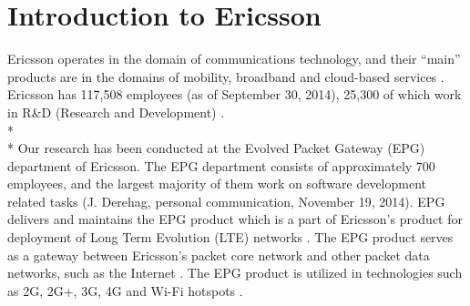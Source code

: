 \documentclass[final_report_innit.tex]{subfiles}
\begin{document}
\section{Introduction to Ericsson}
Ericsson operates in the domain of communications technology, and their “main” products are in the domains of mobility, broadband and cloud-based services \cite{etc} \cite{ecf}. Ericsson has 117,508 employees (as of September 30, 2014), 25,300 of which work in R\&D (Research and Development) \cite{etc}.
\\* 
\\* 
Our research has been conducted at the Evolved Packet Gateway (EPG) department of Ericsson. The EPG department consists of approximately 700 employees, and the largest majority of them work on software development related tasks (J. Derehag, personal communication, November 19, 2014). EPG delivers and maintains the EPG product which is a part of Ericsson’s product for deployment of Long Term Evolution (LTE) networks \cite{eepg}. The EPG product serves as a gateway between Ericsson’s packet core network and other packet data networks, such as the Internet \cite{eepg}. The EPG product is utilized in technologies such as 2G, 2G+, 3G, 4G and Wi-Fi hotspots \cite{eepg}.
\end{document}
